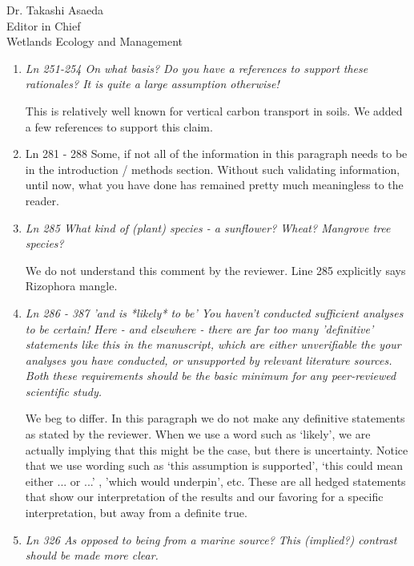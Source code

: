 \documentclass[11pt]{bgcletter}
\begin{document}
\begin{letter}{Dr. Takashi Asaeda\\
 Editor in Chief \\ Wetlands Ecology and Management}
\begin{enumerate}
{\color{blue} Yes, this happens in most soils, but in mangroves bulk densities increase strongly due to hydrostatic pressure. However, we agree in that this sentence is not very relevant for the discussion on differences in bulk density among the two mangrove types.}

\item {\it Ln 251-254 On what basis? Do you have a references to support these rationales? It is quite a large assumption otherwise!}

{\color{blue} This is relatively well known for vertical carbon transport in soils. We added a few references to support this claim. }

\item Ln 281 - 288 Some, if not all of the information in this paragraph needs to be in the introduction / methods section. Without such validating information, until now, what you have done has remained pretty much meaningless to the reader.

\item {\it Ln 285 What kind of (plant) species - a sunflower? Wheat? Mangrove tree species?}

{\color{blue} We do not understand this comment by the reviewer. Line 285 explicitly says Rizophora mangle.}

\item {\it Ln 286 - 387 'and is *likely* to be' 
You haven't conducted sufficient analyses to be certain!
Here - and elsewhere - there are far too many 'definitive' statements like this in the manuscript, which are either unverifiable the your analyses you have conducted, or unsupported by relevant literature sources. Both these requirements should be the basic minimum for any peer-reviewed scientific study.}

{\color{blue} We beg to differ. In this paragraph we do not make any definitive statements as stated by the reviewer. When we use a word such as `likely', we are actually implying that this might be the case, but there is uncertainty. Notice that we use wording such as `this assumption is supported', `this could mean either ... or ...' , 'which would underpin', etc. These are all hedged statements that show our interpretation of the results and our favoring for a specific interpretation, but away from a definite true.}

\item {\it Ln 326 As opposed to being from a marine source? This (implied?) contrast should be made more clear.}


\end{enumerate}
\end{letter}
\end{document}

